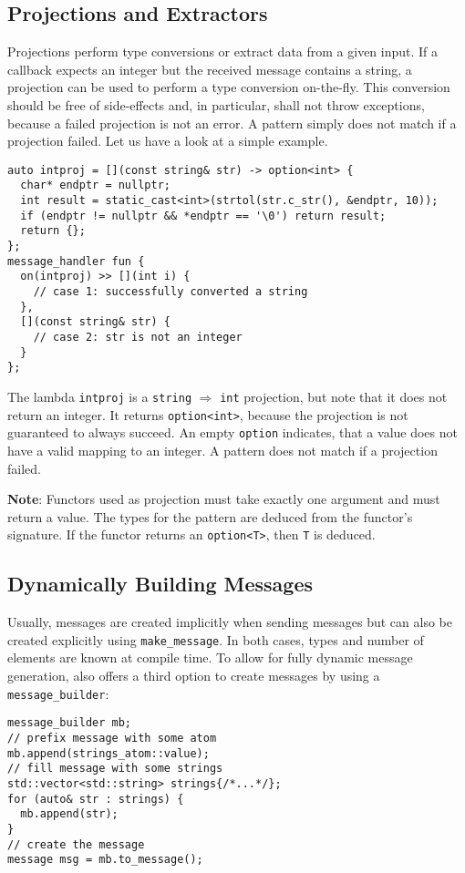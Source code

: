 \subsection{Projections and Extractors}

Projections perform type conversions or extract data from a given input.
If a callback expects an integer but the received message contains a string, a projection can be used to perform a type conversion on-the-fly.
This conversion should be free of side-effects and, in particular, shall not throw exceptions, because a failed projection is not an error.
A pattern simply does not match if a projection failed.
Let us have a look at a simple example.

\begin{lstlisting}
auto intproj = [](const string& str) -> option<int> {
  char* endptr = nullptr;
  int result = static_cast<int>(strtol(str.c_str(), &endptr, 10));
  if (endptr != nullptr && *endptr == '\0') return result;
  return {};
};
message_handler fun {
  on(intproj) >> [](int i) {
    // case 1: successfully converted a string
  },
  [](const string& str) {
    // case 2: str is not an integer
  }
};
\end{lstlisting}

The lambda \lstinline^intproj^ is a \lstinline^string^ $\Rightarrow$ \lstinline^int^ projection, but note that it does not return an integer.
It returns \lstinline^option<int>^, because the projection is not guaranteed to always succeed.
An empty \lstinline^option^ indicates, that a value does not have a valid mapping to an integer.
A pattern does not match if a projection failed.

\textbf{Note}: Functors used as projection must take exactly one argument and must return a value.
The types for the pattern are deduced from the functor's signature.
If the functor returns an \lstinline^option<T>^, then \lstinline^T^ is deduced.

\subsection{Dynamically Building Messages}

Usually, messages are created implicitly when sending messages but can also be created explicitly using \lstinline^make_message^.
In both cases, types and number of elements are known at compile time.
To allow for fully dynamic message generation, \lib also offers a third option to create messages by using a \lstinline^message_builder^:

\begin{lstlisting}
message_builder mb;
// prefix message with some atom
mb.append(strings_atom::value);
// fill message with some strings
std::vector<std::string> strings{/*...*/};
for (auto& str : strings) {
  mb.append(str);
}
// create the message
message msg = mb.to_message();
\end{lstlisting}
